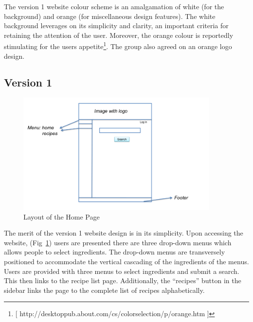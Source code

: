 The version 1 website colour scheme is an amalgamation of white (for the background) and orange (for miscellaneous design features). The white background leverages on its simplicity and clarity, an important criteria for retaining the attention of the user. Moreover, the orange colour is reportedly stimulating for the users appetite\footnote{[ http://desktoppub.about.com/cs/colorselection/p/orange.htm ]}. The group also agreed on an orange logo design. 

\subsection{Version 1}

\begin{figure}[h]
\includegraphics[width=0.9\textwidth]{home_page}
\caption{Layout of the Home Page}
\label{fig:home_page}
\end{figure}

The merit of the version 1 website design is in its simplicity. Upon accessing the website, (Fig~\ref{fig:home_page}) users are presented there are three drop-down menus which allows people to select ingredients. The drop-down menus are transversely positioned to accommodate the vertical cascading of the ingredients of the menus. Users are provided with three menus to select ingredients and submit a search. This then links to the recipe list page. Additionally, the “recipes” button in the sidebar links the page to the complete list of recipes alphabetically.

